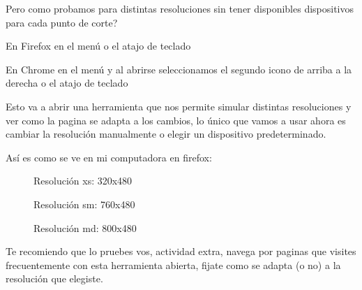 \documentclass[letterpaper,10pt,spanish]{sphinxmanual}
\begin{document}
Pero como probamos para distintas resoluciones sin tener disponibles dispositivos
para cada punto de corte?

En Firefox en el menú  o el atajo de teclado 

\begin{figure}[htbp]
\centering

\noindent{}
\end{figure}

En Chrome en el menú  y al abrirse seleccionamos el segundo icono de arriba a la derecha o el atajo de teclado 

\begin{figure}[htbp]
\centering

\noindent{}
\end{figure}

Esto va a abrir una herramienta que nos permite simular distintas resoluciones
y ver como la pagina se adapta a los cambios, lo único que vamos a usar ahora
es cambiar la resolución manualmente o elegir un dispositivo predeterminado.

Así es como se ve en mi computadora en firefox:

\begin{figure}[htbp]
\centering
\capstart

\noindent{}
\caption{Resolución xs: 320x480}\label{\detokenize{filas-columnas:id1}}\end{figure}

\begin{figure}[htbp]
\centering
\capstart

\noindent{}
\caption{Resolución sm: 760x480}\label{\detokenize{filas-columnas:id2}}\end{figure}

\begin{figure}[htbp]
\centering
\capstart

\noindent{}
\caption{Resolución md: 800x480}\label{\detokenize{filas-columnas:id3}}\end{figure}

Te recomiendo que lo pruebes vos, actividad extra, navega por paginas que visites
frecuentemente con esta herramienta abierta, fijate como se adapta (o no) a
la resolución que elegiste.
\end{document}
